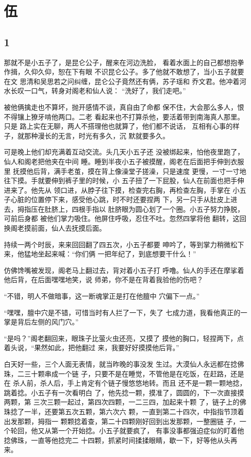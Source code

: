 \section{伍}

{\centering\subsection{1}}

那就不是小五子了，是昆仑公子，醒来在河边洗脸，
看着水面上的自己都想抱拳作揖，久仰久仰，恕在下有眼
不识昆仑公子。多了他就不敢想了，当小五子就要在文
思清和吴思若之问纠缠，昆仑公子竟然还有俩，苏子瑶和
乔文君。他冲着河水长叹一口气，转身对阁老和仙人说：
“洗好了，我们走吧。”

被他俩擒走也不算坏，抛开感情不谈，真自由了命都
保不住，大会那么多人，恨不得镶上獠牙啃他两口。二老
看起来也不打算杀他，要活着带到南海真人那里。只是
路上实在无聊，两人不搭理他也就算了，他们都不说话，
互相有心事的样子，就那种漫长的无言，时光有多久，沉
默就要多久。

可是晚上他们却充满着互动交流。头几天小五子还
没被绑起来，怕他夜里跑了，仙人和阁老把他夹在中间
睡。睡到半夜小五子被摸醒，阁老在后面把手伸到衣服里
抚摸他后背，满手老茧，摸在背上像澡堂子搓澡，只是速度
更慢，一寸一寸地往下摸。手就要伸到裤子里的时候，小
五子扭了一下屁股，仙人在前面也把手伸进来了。他先从
领口进，从脖子往下摸，检查完右胸，再检查左胸，手掌在
小五子心脏的位置停下来，感受他心跳，时不时还要捏两
下，另一只手从肚皮上进去，拇指压在肚脐上，四根手指以
肚脐眼为圆心划了一个圈。小五子努力挣脱，可前后身都
被他们掌力吸住。他屏住呼吸，忍住不吐。忽然四掌将他
翻转，这回换阁老摸前面，仙人去抚摸后面。

持续一两个时辰，来来回回翻了四五次，小五子都要
呻吟了，等到掌力稍微松下来，他猛地坐起来喊：“你们俩
一把年纪了，到底想要干什么！”

仿佛馋嘴被发现，阁老马上翻过去，背对着小五子打
呼噜。仙人的手还在摩挲着他后背，在后面嘿嘿地笑，说
师弟，你不是在背着我验他的伤吧？

“不错，明人不做暗事，这一断魂掌正是打在他膻中
穴偏下一点。”

“嘿嘿，膻中穴是不错，可惜当时有人拦了一下，失了
七成力道，我看他真正的一掌是背后左侧的风门穴。”

“是吗？”阁老翻回来，眼珠子比萤火虫还亮，又摸了
摸他的胸口，轻捏两下，点着头说，“果然如此，把他翻过
来，我要好好摸摸他后背。”
\newline

白天好一些，三个人面无表情，就当昨晚的事没发
生过。大漠仙人永远都在捻佛珠，二三十颗串成一个链
子，只要不是在睡觉，不管他是在吃饭，在赶路，还是在
杀人前，杀人后，手上肯定有个链子慢悠悠地转。而且
还不是一颗一颗地捻，跳着捻。小五子有一次看明白
了，他先捻一颗，摸准了，圆圆的，下一次直接摸两颗，第
三次三颗一起过，第四次四颗，一二三四，加起来十颗
了，链子上的佛珠捻了一半，还要第五次五颗，第六次六
颗，一直到第二十四次，中指指节顶着出发那颗，拇指一
颗颗捻着查，第二十四颗刚好回到出发那颗，一整圈链
子，一个轮回，他又从第一个开始捻。小五子就要疯了，
有事没事都强迫症似的盯着他捻佛珠，一直等他捻完二
十四颗，抓紧时间揉揉眼睛，歇一下，好等他从头再来。

